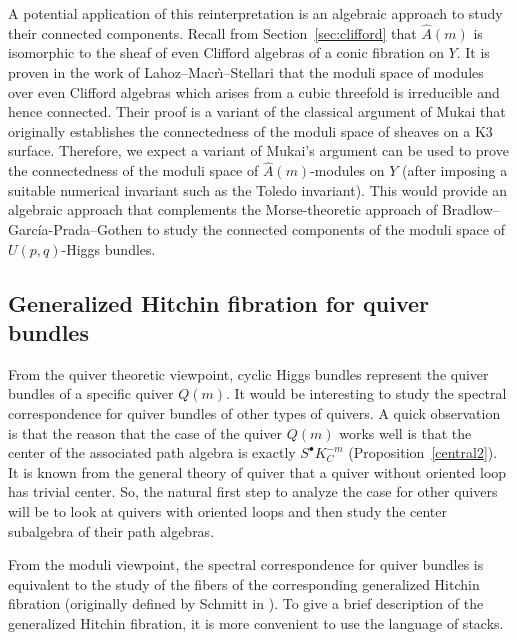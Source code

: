 \documentclass[11pt]{amsart}
\theoremstyle{plain}
\theoremstyle{definition}
\theoremstyle{remark}
\def\wAm{\widehat{A}(m)}
\begin{document}
A potential application of this reinterpretation is an algebraic approach to study their connected components. Recall from Section~\ref{sec:clifford} that $\wAm$ is isomorphic to the sheaf of even Clifford algebras of a conic fibration on $Y$. It is proven in the work of Lahoz--Macr\`{\i}--Stellari \cite[Theorem 2.12]{LahozMacriStellari} that the moduli space of modules over even Clifford algebras which arises from a cubic threefold is irreducible and hence connected. Their proof is a variant of the classical argument of Mukai that originally establishes the connectedness of the moduli space of sheaves on a K3 surface. Therefore, we expect a variant of Mukai's argument can be used to prove the connectedness of the moduli space of $\wAm$-modules on $Y$ (after imposing a suitable numerical invariant such as the Toledo invariant). This would provide an algebraic approach that complements the Morse-theoretic approach of Bradlow--Garc\'{i}a-Prada--Gothen \cite{bradlow-gp-gothen} to study the connected components of the moduli space of $U(p,q)$-Higgs bundles. 

\subsection{Generalized Hitchin fibration for quiver bundles}
From the quiver theoretic viewpoint, cyclic Higgs bundles represent the quiver bundles of a specific quiver $Q(m)$. It would be interesting to study the spectral correspondence for quiver bundles of other types of quivers. A quick observation is that the reason that the case of the quiver $Q(m)$ works well is that the center of the associated path algebra is exactly $S^\bullet K_C^{-m}$ (Proposition~\ref{central2}). It is known from the general theory of quiver that a quiver without oriented loop has trivial center. So, the natural first step to analyze  the case for other quivers will be to look at quivers with oriented loops and then study the center subalgebra of their path algebras. 

From the moduli viewpoint, the spectral correspondence for quiver bundles is equivalent to the study of the fibers of the corresponding generalized Hitchin fibration (originally defined by Schmitt in \cite{schmitt}). To give a brief description of the generalized Hitchin fibration, it is more convenient to use the language of stacks. 
\end{document}
